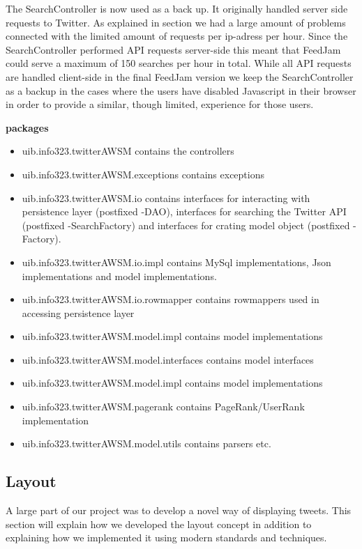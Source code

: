 The SearchController is now used as a back up. It originally handled server side requests to Twitter. As explained in section \label{twitterProblem} we had a large amount of problems connected with the limited amount of requests per ip-adress per hour. Since the SearchController performed API requests server-side this meant that FeedJam could serve a maximum of 150 searches per hour in total. While all API requests are handled client-side in the final FeedJam version we keep the SearchController as a backup in the cases where the users have disabled Javascript in their browser in order to provide a similar, though limited, experience for those users.


{\bf packages}
\begin{itemize}
  \item uib.info323.twitterAWSM contains the controllers
  \item uib.info323.twitterAWSM.exceptions contains exceptions
  \item uib.info323.twitterAWSM.io contains interfaces for interacting with persistence layer (postfixed -DAO), interfaces for searching the Twitter API (postfixed -SearchFactory) and interfaces for crating model object (postfixed -Factory).
  \item uib.info323.twitterAWSM.io.impl contains MySql implementations, Json implementations and model implementations. 
  \item uib.info323.twitterAWSM.io.rowmapper contains rowmappers used in accessing persistence layer
  \item uib.info323.twitterAWSM.model.impl contains model implementations
  \item uib.info323.twitterAWSM.model.interfaces contains model interfaces
  \item uib.info323.twitterAWSM.model.impl contains model implementations
  \item uib.info323.twitterAWSM.pagerank contains PageRank/UserRank implementation
  \item uib.info323.twitterAWSM.model.utils contains parsers etc.
\end{itemize}


\subsection{Layout} %
A large part of our project was to develop a novel way of displaying tweets. This section will explain how we developed the layout concept in addition to explaining how we implemented it using modern standards and techniques.

